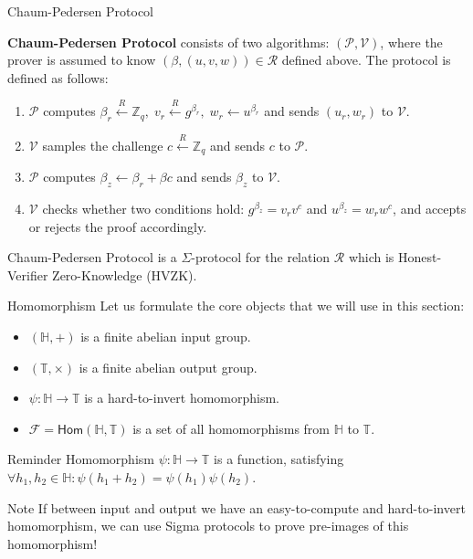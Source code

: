 \documentclass{zkdl-presentation-template}
\begin{document}
    \begin{frame}{Chaum-Pedersen Protocol}
        \begin{definition}
            \textbf{Chaum-Pedersen Protocol} consists of two algorithms: $(\mathcal{P}, \mathcal{V})$, where the prover is assumed to know $(\beta,(u,v,w)) \in \mathcal{R}$ defined above. The protocol is defined as follows:
            \begin{enumerate}
                \item $\mathcal{P}$ computes $\beta_r \xleftarrow{R} \mathbb{Z}_q, \; v_r \xleftarrow{R} g^{\beta_r}, \; w_r \gets u^{\beta_r}$ and sends $(u_r,w_r)$ to $\mathcal{V}$.
                \item $\mathcal{V}$ samples the challenge $c \xleftarrow{R} \mathbb{Z}_q$ and sends $c$ to $\mathcal{P}$.
                \item $\mathcal{P}$ computes $\beta_z \gets \beta_r + \beta c$ and sends $\beta_z$ to $\mathcal{V}$.
                \item $\mathcal{V}$ checks whether two conditions hold: $g^{\beta_z} = v_rv^c$ and $u^{\beta_z} = w_r w^c$, and accepts or rejects the proof accordingly.
            \end{enumerate}
        \end{definition}
        
        \begin{theorem}
            Chaum-Pedersen Protocol is a $\Sigma$-protocol for the relation $\mathcal{R}$ which is Honest-Verifier Zero-Knowledge (HVZK).
        \end{theorem}
    \end{frame}

    \begin{frame}{Homomorphism}
        Let us formulate the core objects that we will use in this section:
        \begin{itemize}
            \item $(\mathbb{H}, +)$ is a finite abelian input group.
            \item $(\mathbb{T}, \times)$ is a finite abelian output group.
            \item $\psi: \mathbb{H} \to \mathbb{T}$ is a hard-to-invert homomorphism.
            \item $\mathcal{F} = \mathsf{Hom}(\mathbb{H}, \mathbb{T})$ is a set of all homomorphisms from $\mathbb{H}$ to $\mathbb{T}$.
        \end{itemize}

        \begin{block}{Reminder}
            Homomorphism $\psi: \mathbb{H} \to \mathbb{T}$ is a function, satisfying $\forall h_1, h_2 \in \mathbb{H}: \psi(h_1 + h_2) = \psi(h_1)\psi(h_2)$.
        \end{block}

        \begin{alertblock}{Note}
            If between input and output we have an easy-to-compute and hard-to-invert homomorphism, we can use Sigma protocols to prove pre-images of this homomorphism!
        \end{alertblock}
    \end{frame}
\end{document}
